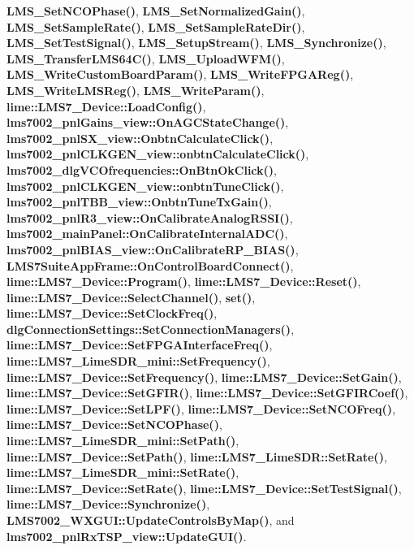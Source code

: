{\bf L\+M\+S\+\_\+\+Set\+N\+C\+O\+Phase()}, {\bf L\+M\+S\+\_\+\+Set\+Normalized\+Gain()}, {\bf L\+M\+S\+\_\+\+Set\+Sample\+Rate()}, {\bf L\+M\+S\+\_\+\+Set\+Sample\+Rate\+Dir()}, {\bf L\+M\+S\+\_\+\+Set\+Test\+Signal()}, {\bf L\+M\+S\+\_\+\+Setup\+Stream()}, {\bf L\+M\+S\+\_\+\+Synchronize()}, {\bf L\+M\+S\+\_\+\+Transfer\+L\+M\+S64\+C()}, {\bf L\+M\+S\+\_\+\+Upload\+W\+F\+M()}, {\bf L\+M\+S\+\_\+\+Write\+Custom\+Board\+Param()}, {\bf L\+M\+S\+\_\+\+Write\+F\+P\+G\+A\+Reg()}, {\bf L\+M\+S\+\_\+\+Write\+L\+M\+S\+Reg()}, {\bf L\+M\+S\+\_\+\+Write\+Param()}, {\bf lime\+::\+L\+M\+S7\+\_\+\+Device\+::\+Load\+Config()}, {\bf lms7002\+\_\+pnl\+Gains\+\_\+view\+::\+On\+A\+G\+C\+State\+Change()}, {\bf lms7002\+\_\+pnl\+S\+X\+\_\+view\+::\+Onbtn\+Calculate\+Click()}, {\bf lms7002\+\_\+pnl\+C\+L\+K\+G\+E\+N\+\_\+view\+::onbtn\+Calculate\+Click()}, {\bf lms7002\+\_\+dlg\+V\+C\+Ofrequencies\+::\+On\+Btn\+Ok\+Click()}, {\bf lms7002\+\_\+pnl\+C\+L\+K\+G\+E\+N\+\_\+view\+::onbtn\+Tune\+Click()}, {\bf lms7002\+\_\+pnl\+T\+B\+B\+\_\+view\+::\+Onbtn\+Tune\+Tx\+Gain()}, {\bf lms7002\+\_\+pnl\+R3\+\_\+view\+::\+On\+Calibrate\+Analog\+R\+S\+S\+I()}, {\bf lms7002\+\_\+main\+Panel\+::\+On\+Calibrate\+Internal\+A\+D\+C()}, {\bf lms7002\+\_\+pnl\+B\+I\+A\+S\+\_\+view\+::\+On\+Calibrate\+R\+P\+\_\+\+B\+I\+A\+S()}, {\bf L\+M\+S7\+Suite\+App\+Frame\+::\+On\+Control\+Board\+Connect()}, {\bf lime\+::\+L\+M\+S7\+\_\+\+Device\+::\+Program()}, {\bf lime\+::\+L\+M\+S7\+\_\+\+Device\+::\+Reset()}, {\bf lime\+::\+L\+M\+S7\+\_\+\+Device\+::\+Select\+Channel()}, {\bf set()}, {\bf lime\+::\+L\+M\+S7\+\_\+\+Device\+::\+Set\+Clock\+Freq()}, {\bf dlg\+Connection\+Settings\+::\+Set\+Connection\+Managers()}, {\bf lime\+::\+L\+M\+S7\+\_\+\+Device\+::\+Set\+F\+P\+G\+A\+Interface\+Freq()}, {\bf lime\+::\+L\+M\+S7\+\_\+\+Lime\+S\+D\+R\+\_\+mini\+::\+Set\+Frequency()}, {\bf lime\+::\+L\+M\+S7\+\_\+\+Device\+::\+Set\+Frequency()}, {\bf lime\+::\+L\+M\+S7\+\_\+\+Device\+::\+Set\+Gain()}, {\bf lime\+::\+L\+M\+S7\+\_\+\+Device\+::\+Set\+G\+F\+I\+R()}, {\bf lime\+::\+L\+M\+S7\+\_\+\+Device\+::\+Set\+G\+F\+I\+R\+Coef()}, {\bf lime\+::\+L\+M\+S7\+\_\+\+Device\+::\+Set\+L\+P\+F()}, {\bf lime\+::\+L\+M\+S7\+\_\+\+Device\+::\+Set\+N\+C\+O\+Freq()}, {\bf lime\+::\+L\+M\+S7\+\_\+\+Device\+::\+Set\+N\+C\+O\+Phase()}, {\bf lime\+::\+L\+M\+S7\+\_\+\+Lime\+S\+D\+R\+\_\+mini\+::\+Set\+Path()}, {\bf lime\+::\+L\+M\+S7\+\_\+\+Device\+::\+Set\+Path()}, {\bf lime\+::\+L\+M\+S7\+\_\+\+Lime\+S\+D\+R\+::\+Set\+Rate()}, {\bf lime\+::\+L\+M\+S7\+\_\+\+Lime\+S\+D\+R\+\_\+mini\+::\+Set\+Rate()}, {\bf lime\+::\+L\+M\+S7\+\_\+\+Device\+::\+Set\+Rate()}, {\bf lime\+::\+L\+M\+S7\+\_\+\+Device\+::\+Set\+Test\+Signal()}, {\bf lime\+::\+L\+M\+S7\+\_\+\+Device\+::\+Synchronize()}, {\bf L\+M\+S7002\+\_\+\+W\+X\+G\+U\+I\+::\+Update\+Controls\+By\+Map()}, and {\bf lms7002\+\_\+pnl\+Rx\+T\+S\+P\+\_\+view\+::\+Update\+G\+U\+I()}.



